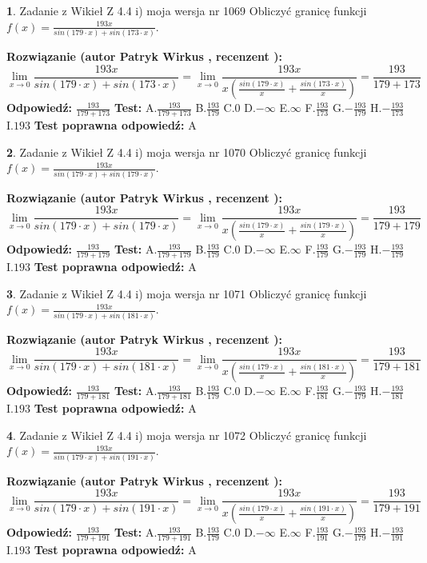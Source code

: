 \documentclass[12pt, a4paper]{article}
\theoremstyle{definition} %
\newtheorem{zad}{}
\newcommand{\zadStart}[1]{\begin{zad}#1\newline}
\newcommand{\zadStop}{\end{zad}}
\newcommand{\rozwStart}[2]{\noindent \textbf{Rozwiązanie (autor #1 , recenzent #2): }\newline}
\newcommand{\rozwStop}{\newline}
\newcommand{\odpStart}{\noindent \textbf{Odpowiedź:}\newline}
\newcommand{\odpStop}{\newline}
\newcommand{\testStart}{\noindent \textbf{Test:}\newline}
\newcommand{\testStop}{\newline}
\newcommand{\kluczStart}{\noindent \textbf{Test poprawna odpowiedź:}\newline}
\newcommand{\kluczStop}{\newline}
\begin{document}
\zadStart{Zadanie z Wikieł Z 4.4 i) moja wersja nr 1069}
Obliczyć granicę funkcji $f(x)=\frac{193x}{sin(179\cdot x) +sin(173\cdot x)}$.
\zadStop
\rozwStart{Patryk Wirkus}{}
$$\lim\limits_{x\to 0}\frac{193x}{sin(179\cdot x) +sin(173\cdot x)}=\lim\limits_{x\to 0}\frac{193x}{x(\frac{sin(179\cdot x)}{x}+\frac{sin(173\cdot x)}{x})}=\frac{193}{179+173}$$
\rozwStop
\odpStart
$\frac{193}{179+173}$
\odpStop
\testStart
A.$\frac{193}{179+173}$
B.$\frac{193}{179}$
C.$0$
D.$-\infty$
E.$\infty$
F.$\frac{193}{173}$
G.$-\frac{193}{179}$
H.$-\frac{193}{173}$
I.$193$
\testStop
\kluczStart
A
\kluczStop



\zadStart{Zadanie z Wikieł Z 4.4 i) moja wersja nr 1070}
Obliczyć granicę funkcji $f(x)=\frac{193x}{sin(179\cdot x) +sin(179\cdot x)}$.
\zadStop
\rozwStart{Patryk Wirkus}{}
$$\lim\limits_{x\to 0}\frac{193x}{sin(179\cdot x) +sin(179\cdot x)}=\lim\limits_{x\to 0}\frac{193x}{x(\frac{sin(179\cdot x)}{x}+\frac{sin(179\cdot x)}{x})}=\frac{193}{179+179}$$
\rozwStop
\odpStart
$\frac{193}{179+179}$
\odpStop
\testStart
A.$\frac{193}{179+179}$
B.$\frac{193}{179}$
C.$0$
D.$-\infty$
E.$\infty$
F.$\frac{193}{179}$
G.$-\frac{193}{179}$
H.$-\frac{193}{179}$
I.$193$
\testStop
\kluczStart
A
\kluczStop



\zadStart{Zadanie z Wikieł Z 4.4 i) moja wersja nr 1071}
Obliczyć granicę funkcji $f(x)=\frac{193x}{sin(179\cdot x) +sin(181\cdot x)}$.
\zadStop
\rozwStart{Patryk Wirkus}{}
$$\lim\limits_{x\to 0}\frac{193x}{sin(179\cdot x) +sin(181\cdot x)}=\lim\limits_{x\to 0}\frac{193x}{x(\frac{sin(179\cdot x)}{x}+\frac{sin(181\cdot x)}{x})}=\frac{193}{179+181}$$
\rozwStop
\odpStart
$\frac{193}{179+181}$
\odpStop
\testStart
A.$\frac{193}{179+181}$
B.$\frac{193}{179}$
C.$0$
D.$-\infty$
E.$\infty$
F.$\frac{193}{181}$
G.$-\frac{193}{179}$
H.$-\frac{193}{181}$
I.$193$
\testStop
\kluczStart
A
\kluczStop



\zadStart{Zadanie z Wikieł Z 4.4 i) moja wersja nr 1072}
Obliczyć granicę funkcji $f(x)=\frac{193x}{sin(179\cdot x) +sin(191\cdot x)}$.
\zadStop
\rozwStart{Patryk Wirkus}{}
$$\lim\limits_{x\to 0}\frac{193x}{sin(179\cdot x) +sin(191\cdot x)}=\lim\limits_{x\to 0}\frac{193x}{x(\frac{sin(179\cdot x)}{x}+\frac{sin(191\cdot x)}{x})}=\frac{193}{179+191}$$
\rozwStop
\odpStart
$\frac{193}{179+191}$
\odpStop
\testStart
A.$\frac{193}{179+191}$
B.$\frac{193}{179}$
C.$0$
D.$-\infty$
E.$\infty$
F.$\frac{193}{191}$
G.$-\frac{193}{179}$
H.$-\frac{193}{191}$
I.$193$
\testStop
\kluczStart
A
\kluczStop
\end{document}
